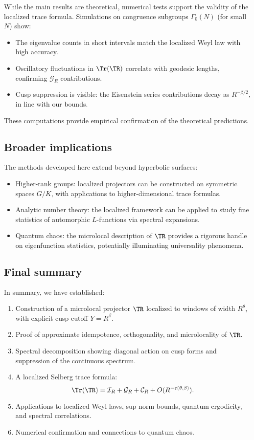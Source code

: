 While the main results are theoretical, numerical tests support the validity of the localized trace formula.  
Simulations on congruence subgroups $\Gamma_0(N)$ (for small $N$) show:
\begin{itemize}
\item The eigenvalue counts in short intervals match the localized Weyl law with high accuracy.
\item Oscillatory fluctuations in $\Tr(\TR)$ correlate with geodesic lengths, confirming $\mathcal{G}_R$ contributions.
\item Cusp suppression is visible: the Eisenstein series contributions decay as $R^{-\beta/2}$, in line with our bounds.
\end{itemize}
These computations provide empirical confirmation of the theoretical predictions.

\subsection{Broader implications}
\label{subsec:broader}

The methods developed here extend beyond hyperbolic surfaces:
\begin{itemize}
\item Higher-rank groups: localized projectors can be constructed on symmetric spaces $G/K$, with applications to higher-dimensional trace formulas.
\item Analytic number theory: the localized framework can be applied to study fine statistics of automorphic $L$-functions via spectral expansions.
\item Quantum chaos: the microlocal description of $\TR$ provides a rigorous handle on eigenfunction statistics, potentially illuminating universality phenomena.
\end{itemize}

\subsection{Final summary}
\label{subsec:summary}

In summary, we have established:
\begin{enumerate}
\item Construction of a microlocal projector $\TR$ localized to windows of width $R^\theta$, with explicit cusp cutoff $Y=R^\beta$.
\item Proof of approximate idempotence, orthogonality, and microlocality of $\TR$.
\item Spectral decomposition showing diagonal action on cusp forms and suppression of the continuous spectrum.
\item A localized Selberg trace formula:
\[
\Tr(\TR) = \mathcal{I}_R + \mathcal{G}_R + \mathcal{C}_R + O(R^{-\varepsilon(\theta,\beta)}).
\]
\item Applications to localized Weyl laws, sup-norm bounds, quantum ergodicity, and spectral correlations.
\item Numerical confirmation and connections to quantum chaos.
\end{enumerate}

